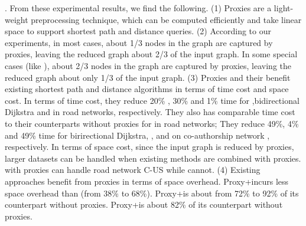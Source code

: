\vspace{-0.5ex}
.
From these experimental results, we find the following. (1) Proxies are a light-weight preprocessing technique, which can be computed efficiently and take linear space to support shortest path and distance queries.  (2) According to our experiments, in most cases, about 1/3 nodes in the graph are captured by proxies, leaving the reduced graph about 2/3 of the input graph. In some special cases (like \dblpone), about 2/3 nodes in the graph are captured by proxies, leaving the reduced graph about only 1/3 of the input graph. (3) Proxies and their \dras benefit existing shortest path and distance algorithms in terms of time cost and space cost. In terms of time cost, \eg they reduce 20\% , 30\% and 1\% time for \arcflag ,bidirectional Dijkstra and \ah in road networks, respectively. They also has comparable time cost to their counterparts without proxies for \tnr in road networks; They reduce 49\%, 4\% and 49\% time for birirectional Dijkstra, \arcflag, and \tnr on co-authorship network \dblpone, respectively. In terms of space cost, since the input graph is reduced by proxies, larger datasets can be handled when existing methods are combined with proxies. \eg \tnr with proxies can handle road network C-US while \tnr cannot. (4) Existing approaches benefit from proxies in terms of space overhead. Proxy+\arcflag incurs less space overhead than \arcflag (from 38\% to 68\%). Proxy+\tnr is about from 72\% to 92\% of its counterpart without proxies.  Proxy+\ah is about 82\% of its counterpart without proxies.

